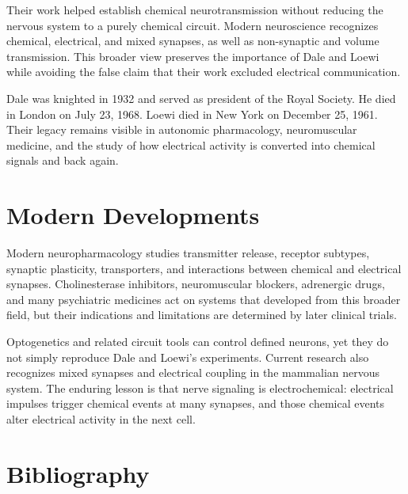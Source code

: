 Their work helped establish chemical neurotransmission without reducing the nervous system to a purely chemical circuit. Modern neuroscience recognizes chemical, electrical, and mixed synapses, as well as non-synaptic and volume transmission. This broader view preserves the importance of Dale and Loewi while avoiding the false claim that their work excluded electrical communication.

Dale was knighted in 1932 and served as president of the Royal Society. He died in London on July 23, 1968. Loewi died in New York on December 25, 1961. Their legacy remains visible in autonomic pharmacology, neuromuscular medicine, and the study of how electrical activity is converted into chemical signals and back again.

\section{Modern Developments}

Modern neuropharmacology studies transmitter release, receptor subtypes, synaptic plasticity, transporters, and interactions between chemical and electrical synapses. Cholinesterase inhibitors, neuromuscular blockers, adrenergic drugs, and many psychiatric medicines act on systems that developed from this broader field, but their indications and limitations are determined by later clinical trials.

Optogenetics and related circuit tools can control defined neurons, yet they do not simply reproduce Dale and Loewi's experiments. Current research also recognizes mixed synapses and electrical coupling in the mammalian nervous system. The enduring lesson is that nerve signaling is electrochemical: electrical impulses trigger chemical events at many synapses, and those chemical events alter electrical activity in the next cell.

\section{Bibliography}

